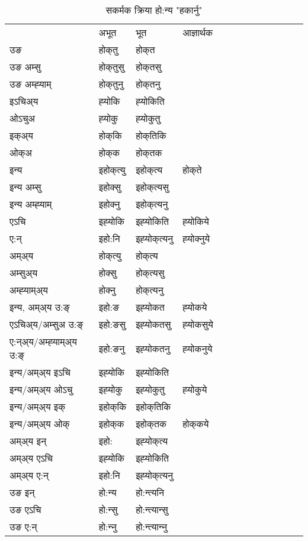 \begin{table}[H]
\label{okt.vt} \centering
\caption{सकर्मक क्रिया  हो:न्य  "हकार्नु"  }
\begin{tabular}{l|l|l|l|l|l|l|l|l|l|l|l|l}  \toprule
&अभूत & भूत & आज्ञार्थक \\ 
उङ &होक्‌तु &होक्‌त \\ 
उङ अम्सु&होक्‌तुसु &होक्‌तसु \\ 
उङ अम्ह्‍याम्&होक्‌तुनु &होक्‌तनु \\ 
इऽचिअ्य &ह्‍योकि &ह्‍योकिति   \\ 
ओऽचुअ        &ह्‍योकु &ह्‍योकुतु   \\ 
इक्अ्य&होक्‌कि &होक्‌तिकि   \\ 
ओक्अ &होक्‌क &होक्‌तक   \\ 
इन्य & इहोक्‌त्यु  & इहोक्‌त्य &होक्‌ते  \\ 
इन्य अम्सु& इहोक्सु  & इहोक्‌त्यसु   \\ 
इन्य अम्ह्‍याम्& इहोक्‍नु  & इहोक्‌त्यनु   \\ 
एऽचि & इह्‍योकि & इह्‍योकिति &ह्‍योकिये    \\ 
ए:न् & इहो:नि  & इह्‍योक्‌त्यनु &ह्‍योक्‍नुये  \\ 
अम्अ्य & होक्‌त्यु  & होक्‌त्य  \\ 
अम्सुअ्य & होक्सु & होक्‌त्यसु  \\ 
अम्ह्‍याम्अ्य & होक्‍नु  & होक्‌त्यनु \\ 
\midrule
इन्य, अम्अ्य उ:ङ्‌ &इहो:ङ &इह्‍योकत &ह्‍योकये \\ 
एऽचिअ्य/अम्सुअ उ:ङ्‌ &इहो:ङसु &इह्‍योकतसु &ह्‍योकसुये \\ 
ए:न्अ्य/अम्ह्‍याम्अ्य उ:ङ्‌ &इहो:ङनु &इह्‍योकतनु &ह्‍योकनुये \\ 
इन्य/अम्अ्य इऽचि &इह्‍योकि &इह्‍योकिति    \\ 
इन्य/अम्अ्य ओऽचु &इह्‍योकु &इह्‍योकुतु  &ह्‍योकुये  \\ 
इन्य/अम्अ्य इक् &इहोक्‌कि &इहोक्‌तिकि   \\ 
इन्य/अम्अ्य ओक् &इहोक्‌क &इहोक्‌तक  &होक्‌कये  \\ 
अम्अ्य इन् & इहो: & इह्‍योक्‌त्य   \\ 
अम्अ्य एऽचि & इह्‍योकि & इह्‍योकिति    \\ 
अम्अ्य ए:न् & इहो:नि  & इह्‍योक्‌त्यनु  \\ 
\midrule
उङ इन् & हो:न्य  & हो:न्त्यनि  \\ 
उङ एऽचि & हो:न्सु  & हो:न्त्यान्सु   \\ 
उङ ए:न्& हो:न्‍नु  & हो:न्त्यान्‍नु   \\ 
\bottomrule
\end{tabular}
\end{table}



